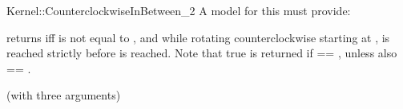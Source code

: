\begin{ccRefFunctionObjectConcept}{Kernel::CounterclockwiseInBetween_2}
A model for this must provide:


{returns  iff  is not equal to , and 
        while rotating counterclockwise starting at , 
         is reached strictly before  is reached.
        Note that true is returned if  == , unless
        also  == .}

\ccRefines
{} (with three arguments)

\ccSeeAlso
{}\\

\end{ccRefFunctionObjectConcept}
